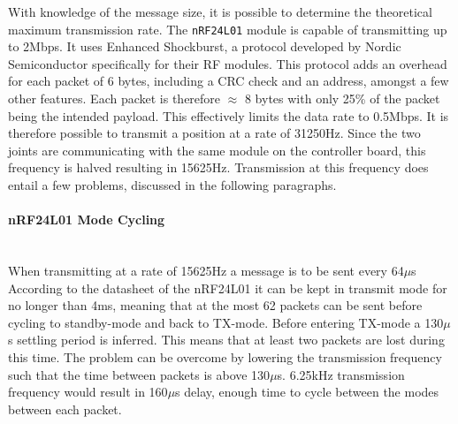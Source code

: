 With knowledge of the message size, it is possible to determine the theoretical maximum transmission rate.
The \texttt{nRF24L01} module is capable of transmitting up to 2Mbps.
It uses Enhanced Shockburst, a protocol developed by Nordic Semiconductor specifically for their RF modules.
This protocol adds an overhead for each packet of 6 bytes, including a CRC check and an address, amongst a few other features.
Each packet is therefore $\approx$ 8 bytes with only 25\% of the packet being the intended payload.
This effectively limits the data rate to 0.5Mbps.
It is therefore possible to transmit a position at a rate of 31250Hz.
Since the two joints are communicating with the same module on the controller board, this frequency is halved resulting in 15625Hz.
Transmission at this frequency does entail a few problems, discussed in the following paragraphs.
\paragraph{nRF24L01 Mode Cycling}~\\ %
\label{par:nrf24l01_mode_cycling}
When transmitting at a rate of 15625Hz a message is to be sent every 64$\mu$s
According to the datasheet of the nRF24L01 it can be kept in transmit mode for no longer than 4ms, meaning that at the most 62 packets can be sent before cycling to standby-mode and back to TX-mode.
Before entering TX-mode a 130$\mu$s settling period is inferred.
This means that at least two packets are lost during this time.
The problem can be overcome by lowering the transmission frequency such that the time between packets is above 130$\mu$s.
6.25kHz transmission frequency would result in 160$\mu$s delay, enough time to cycle between the modes between each packet.
